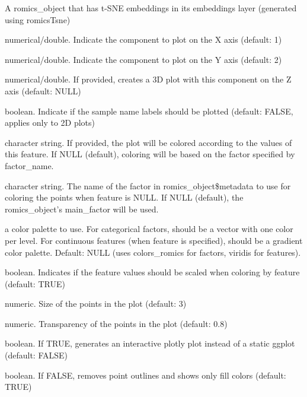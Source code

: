 \documentclass[a4paper]{book}
\begin{document}
\begin{Arguments}
\begin{ldescription}
\item[\code{romics\_object}] A romics\_object that has t-SNE embeddings in its embeddings layer (generated using romicsTsne)

\item[\code{Xcomp}] numerical/double. Indicate the component to plot on the X axis (default: 1)

\item[\code{Ycomp}] numerical/double. Indicate the component to plot on the Y axis (default: 2)

\item[\code{Zcomp}] numerical/double. If provided, creates a 3D plot with this component on the Z axis (default: NULL)

\item[\code{label}] boolean. Indicate if the sample name labels should be plotted (default: FALSE, applies only to 2D plots)

\item[\code{feature}] character string. If provided, the plot will be colored according to the values of this feature.
If NULL (default), coloring will be based on the factor specified by factor\_name.

\item[\code{factor\_name}] character string. The name of the factor in romics\_object\$metadata to use for coloring the points
when feature is NULL. If NULL (default), the romics\_object's main\_factor will be used.

\item[\code{color\_palette}] a color palette to use. For categorical factors, should be a vector with one color per level.
For continuous features (when feature is specified), should be a gradient color palette.
Default: NULL (uses colors\_romics for factors, viridis for features).

\item[\code{standardize}] boolean. Indicates if the feature values should be scaled when coloring by feature (default: TRUE)

\item[\code{size}] numeric. Size of the points in the plot (default: 3)

\item[\code{alpha}] numeric. Transparency of the points in the plot (default: 0.8)

\item[\code{plotly}] boolean. If TRUE, generates an interactive plotly plot instead of a static ggplot (default: FALSE)

\item[\code{show\_outline}] boolean. If FALSE, removes point outlines and shows only fill colors (default: TRUE)
\end{ldescription}
\end{Arguments}
\end{document}

